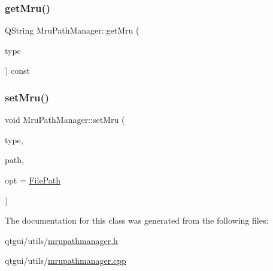 \subsubsection{\texorpdfstring{getMru()}{getMru()}}
{\footnotesize\ttfamily Q\+String Mru\+Path\+Manager\+::get\+Mru (\begin{DoxyParamCaption}\item[{\mbox{\hyperlink{class_mru_path_manager_af76b40b430d36bd39ed8c41ef72f66c4}{Mru\+Path\+Manager\+::\+M\+R\+U\+Type}}}]{type }\end{DoxyParamCaption}) const}

\mbox{\label{class_mru_path_manager_a4736d4bf946a95923f9261a37f87010f}} 
\subsubsection{\texorpdfstring{setMru()}{setMru()}}
{\footnotesize\ttfamily void Mru\+Path\+Manager\+::set\+Mru (\begin{DoxyParamCaption}\item[{\mbox{\hyperlink{class_mru_path_manager_af76b40b430d36bd39ed8c41ef72f66c4}{Mru\+Path\+Manager\+::\+M\+R\+U\+Type}}}]{type,  }\item[{const Q\+String \&}]{path,  }\item[{\mbox{\hyperlink{class_mru_path_manager_a7d98725d2fb645b3d19fdf55ef2286b5}{Set\+Options}}}]{opt = {\ttfamily \mbox{\hyperlink{class_mru_path_manager_a7d98725d2fb645b3d19fdf55ef2286b5ac9bb23f8cf71965e0d242ab5e2f42dfc}{File\+Path}}} }\end{DoxyParamCaption})}



The documentation for this class was generated from the following files\+:\begin{DoxyCompactItemize}
\item 
qtgui/utils/\mbox{\hyperlink{mrupathmanager_8h}{mrupathmanager.\+h}}\item 
qtgui/utils/\mbox{\hyperlink{mrupathmanager_8cpp}{mrupathmanager.\+cpp}}\end{DoxyCompactItemize}

